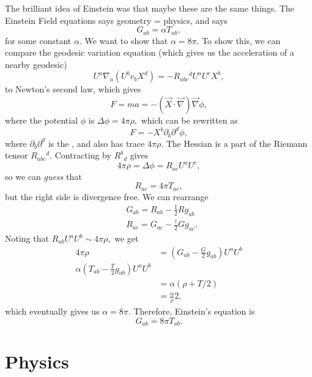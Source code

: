 \documentclass{article}
\numberwithin{equation}{section}
\begin{document}
The brilliant idea of Einstein was that maybe these are the same things. The Einstein Field equations says geometry = physics, and says 
\begin{equation*}
    G_{ab} = \alpha T_{ab},
\end{equation*}
for some constant $\alpha.$ We want to show that $\alpha = 8\pi.$ To show this, we can compare the geodesic variation equation (which gives us the acceleration of a nearby geodesic)
\begin{equation*}
    U^a\nabla_a(U^bv_bX^d) = -R_{abc}{}^{d}U^aU^cX^b,
\end{equation*}
to Newton's second law, which gives 
\begin{equation*}
    F = ma = -(\vec{X} \cdot \vec{\nabla})\vec{\nabla}\phi,
\end{equation*}
where the potential $\phi$ is $\Delta \phi = 4\pi \rho,$ which can be rewritten as 
\begin{equation*}
    F = -X^b\partial_b\partial^d \phi,
\end{equation*}
where $\partial_b\partial^d$ is the , and also has trace $4\pi \rho$. The Hessian is a part of the Riemann tensor $R_{abc}{}^d.$ Contracting by $R^{b}{}_{d}$ gives
\begin{equation*}
    4\pi \rho = \Delta \phi = R_{ac} U^a U^c,
\end{equation*}
so we can \textit{guess} that 
\begin{equation*}
    R_{ac} = 4\pi T_{ac},
\end{equation*}
but the right side is divergence free. We can rearrange
\begin{align*}
    & G_{ab} = R_{ab} - \frac{1}{2}Rg_{ab} \\ 
    & R_{ac} = G_{ac} - \frac{!}{2}Gg_{ac},
\end{align*}
Noting that $R_{ab}U^aU^b \sim 4\pi \rho,$ we get
\begin{align*}
    4\pi \rho &= (G_{ab} - \frac{G}{2}g_{ab})U^aU^b \\ 
    \alpha \left(T_{ab}-\frac{T}{2}g_{ab}\right)U^aU^b \\ 
    &= \alpha\left(\rho + T/2\right) \\ 
    &= \frac{\alpha}{\rho}{2},
\end{align*}
which eventually gives us $\alpha = 8\pi.$ Therefore, Einstein's equation is 
\begin{equation*}
    G_{ab} = 8\pi T_{ab}.
\end{equation*}
\section{Physics}
\end{document}
